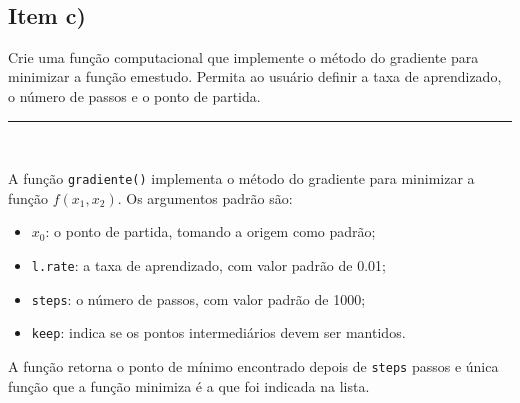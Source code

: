 \documentclass[
  a4paperpaper,
]{article}
\providecommand{\tightlist}{%
  \setlength{\itemsep}{0pt}\setlength{\parskip}{0pt}}\usepackage{longtable,booktabs,array}
\begin{document}
~

\subsection{Item c)}\label{item-c}

Crie uma função computacional que implemente o método do gradiente para
minimizar a função emestudo. Permita ao usuário definir a taxa de
aprendizado, o número de passos e o ponto de partida.

\begin{center}\rule{0.5\linewidth}{0.5pt}\end{center}

~

A função \texttt{gradiente()} implementa o método do gradiente para
minimizar a função \(f(x_1, x_2)\). Os argumentos padrão são:

\begin{itemize}
\tightlist
\item
  \(x_0\): o ponto de partida, tomando a origem como padrão;
\item
  \texttt{l.rate}: a taxa de aprendizado, com valor padrão de 0.01;
\item
  \texttt{steps}: o número de passos, com valor padrão de 1000;
\item
  \texttt{keep}: indica se os pontos intermediários devem ser mantidos.
\end{itemize}

A função retorna o ponto de mínimo encontrado depois de \texttt{steps}
passos e única função que a função minimiza é a que foi indicada na
lista.

~
\end{document}
